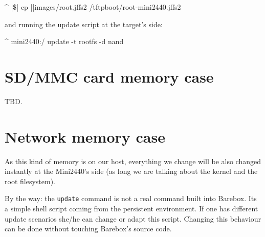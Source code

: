 \begin{ptxshell}[escapechar=|]{^}
|\$| cp |\ptxdistPlatformDir |images/root.jffs2 /tftpboot/root-mini2440.jffs2
\end{ptxshell}

and running the update script at the target's side:

\begin{ptxshell}[escapechar=|]{^}
mini2440:/ update -t rootfs -d nand
\end{ptxshell}

\section{SD/MMC card memory case}

TBD.

\section{Network memory case}

As this kind of memory is on our host, everything we change will be also
changed instantly at the Mini2440's side (as long we are talking about the
kernel and the root filesystem).

By the way: the \texttt{update} command is not a real command built into
Barebox. Its a simple shell script coming from the persistent environment.
If one has different update scenarios she/he can change or adapt this script.
Changing this behaviour can be done without touching Barebox's source code.

%
